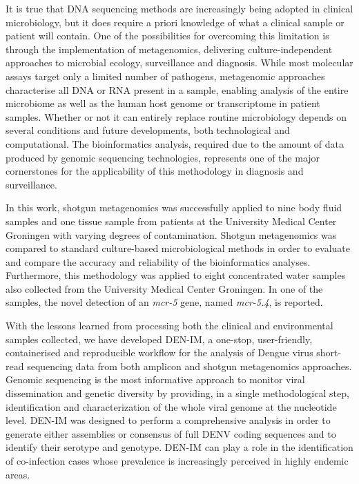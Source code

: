 It is true that DNA sequencing methods are increasingly being adopted in clinical microbiology, but it does require a priori knowledge of what a clinical sample or patient will contain. One of the possibilities for overcoming this limitation is through the implementation of metagenomics, delivering culture-independent approaches to microbial ecology, surveillance and diagnosis. While most molecular assays target only a limited number of pathogens, metagenomic approaches characterise all DNA or RNA present in a sample, enabling analysis of the entire microbiome as well as the human host genome or transcriptome in patient samples. Whether or not it can entirely replace routine microbiology depends on several conditions and future developments, both technological and computational. The bioinformatics analysis, required due to the amount of data produced by genomic sequencing technologies, represents one of the major cornerstones for the applicability of this methodology in diagnosis and surveillance. 

In this work, shotgun metagenomics was successfully applied to nine body fluid samples and one tissue sample from patients at the University Medical Center Groningen with varying degrees of contamination. Shotgun metagenomics was compared to standard culture-based microbiological methods in order to evaluate and compare the accuracy and reliability of the bioinformatics analyses. Furthermore, this methodology was applied to eight concentrated water
samples also collected from the University Medical Center Groningen. In one of the samples, the novel detection of an \textit{mcr-5} gene, named \textit{mcr-5.4}, is reported.

With the lessons learned from processing both the clinical and environmental samples collected, we have developed DEN-IM, a one-stop, user-friendly, containerised and reproducible workflow for the analysis of Dengue virus short-read sequencing data from both amplicon and shotgun metagenomics approaches. Genomic sequencing is the most informative approach to monitor viral dissemination and genetic diversity by providing, in a single methodological step, identification and characterization of the whole viral genome at the nucleotide level. DEN-IM was designed to perform a comprehensive analysis in order to generate either assemblies or consensus of full DENV coding sequences and to identify their serotype and genotype. DEN-IM can play a role in the identification of co-infection cases whose prevalence is increasingly perceived in highly endemic areas.

